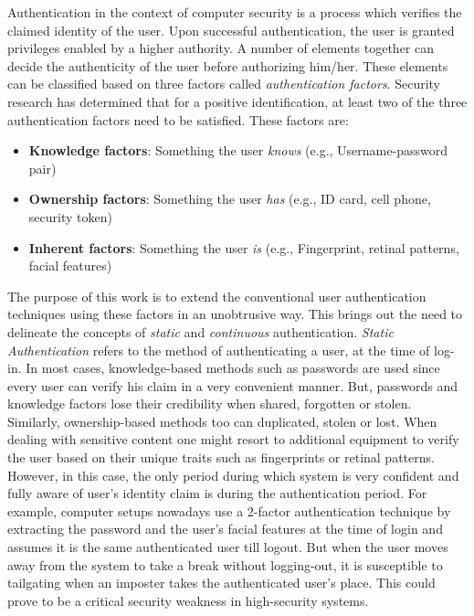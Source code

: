 \documentclass[12pt]{report}			%
\begin{document}
Authentication in the context of computer security is a process which verifies the claimed identity of the user. Upon successful authentication, the user is granted privileges enabled by a higher authority. A number of elements together can decide the authenticity of the user before authorizing him/her. These elements can be classified based on three factors called \emph{authentication factors}.
Security research has determined that for a positive identification, at least two of the three authentication factors need to be satisfied.
These factors are:

\begin{itemize}
	\item \textbf{Knowledge factors}: Something the user \emph{knows} (e.g., Username-password pair)
	\item \textbf{Ownership factors}: Something the user \emph{has} (e.g., ID card, cell phone, security token)
	\item \textbf{Inherent factors}: Something the user \emph{is} (e.g., Fingerprint, retinal patterns, facial features)
\end{itemize}

The purpose of this work is to extend the conventional user authentication techniques using these factors in an unobtrusive way.
This brings out the need to delineate the concepts of \emph{static} and \emph{continuous} authentication.
\emph{Static Authentication} refers to the method of authenticating a user, at the time of log-in. In most cases, knowledge-based methods such as passwords are used since every user can verify his claim in a very convenient manner. But, passwords and knowledge factors lose their credibility when shared, forgotten or stolen. Similarly, ownership-based methods too can duplicated, stolen or lost.
When dealing with sensitive content one might resort to additional equipment to verify the user based on their unique traits such as fingerprints or retinal patterns. However, in this case, the only period during which system is very confident and fully aware of user's identity claim is during the authentication period.
For example, computer setups nowadays use a 2-factor authentication technique by extracting the password and the user's facial features at the time of login and assumes it is the same authenticated user till logout. But when the user moves away from the system to take a break without logging-out, it is susceptible to tailgating when an imposter takes the authenticated user's place. This could prove to be a critical security weakness in  high-security systems.
\end{document}
